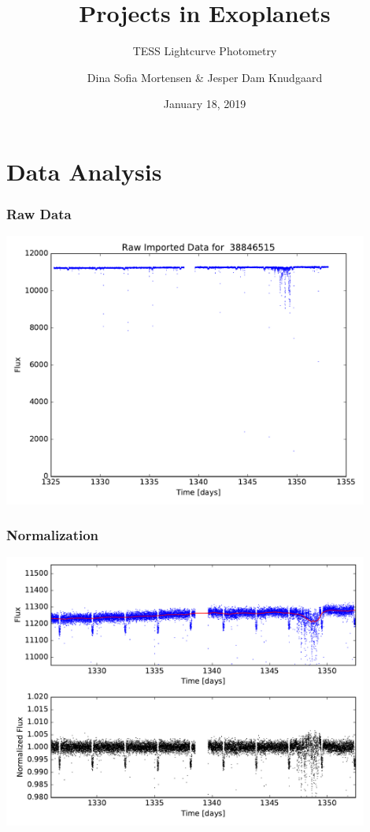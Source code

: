 \documentclass[notes]{beamer}
\title{Projects in Exoplanets}
\subtitle{TESS Lightcurve Photometry}
\author{Dina Sofia Mortensen \& Jesper Dam Knudgaard}
\institute{Stellar Astrophysics Centre, Aarhus University}
\date{January 18, 2019}
\begin{document}
\begin{frame}
\titlepage
\end{frame}

\section{Data Analysis}

\begin{frame}
\frametitle{Raw Data}
\centering
\includegraphics[width=0.9\textwidth]{../figures/2019-1-15_16:2:14_rawdata_TIC38846515.pdf}
\end{frame}

\begin{frame}
\frametitle{Normalization}
\centering
\includegraphics[width=0.9\textwidth]{../figures/2018-11-9_14:25:51_norm_curve0.pdf}
\end{frame}
\end{document}
